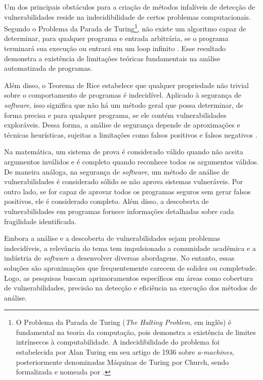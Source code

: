         Um dos principais obstáculos para a criação de métodos infalíveis de detecção de vulnerabilidades reside na indecidibilidade de certos problemas computacionais. Segundo o Problema da Parada de Turing\footnote{O Problema da Parada de Turing (\textit{The Halting Problem}, em inglês) é fundamental na teoria da computação, pois demonstra a existência de limites intrínsecos à computabilidade. A indecidibilidade do problema foi estabelecida por Alan Turing em seu artigo de 1936 sobre \textit{a-machines}, posteriormente denominadas Máquinas de Turing por Church, sendo formalizada e nomeada por .}, não existe um algoritmo capaz de determinar, para qualquer programa e entrada arbitrária, se o programa terminará sua execução ou entrará em um loop infinito \cite{lucas2021}. Esse resultado demonstra a existência de limitações teóricas fundamentais na análise automatizada de programas.

        Além disso, o Teorema de Rice estabelece que qualquer propriedade não trivial sobre o comportamento de programas é indecidível. Aplicado à segurança de \textit{software}, isso significa que não há um método geral que possa determinar, de forma precisa e para qualquer programa, se ele contém vulnerabilidades exploráveis. Dessa forma, a análise de segurança depende de aproximações e técnicas heurísticas, sujeitas a limitações como falsos positivos e falsos negativos \cite{ghaffarian2017}.

        Na matemática, um sistema de prova é considerado válido quando não aceita argumentos inválidos e é completo quando reconhece todos os argumentos válidos. De maneira análoga, na segurança de \textit{software}, um método de análise de vulnerabilidades é considerado sólido se não aprova sistemas vulneráveis. Por outro lado, se for capaz de aprovar todos os programas seguros sem gerar falsos positivos, ele é considerado completo. Além disso, a descoberta de vulnerabilidades em programas fornece informações detalhadas sobre cada fragilidade identificada.

        Embora a análise e a descoberta de vulnerabilidades sejam problemas indecidíveis, a relevância do tema tem impulsionado a comunidade acadêmica e a indústria de \textit{software} a desenvolver diversas abordagens. No entanto, essas soluções são aproximações que frequentemente carecem de solidez ou completude. Logo, as pesquisas buscam aprimoramentos específicos em áreas como cobertura de vulnerabilidades, precisão na detecção e eficiência na execução dos métodos de análise.

